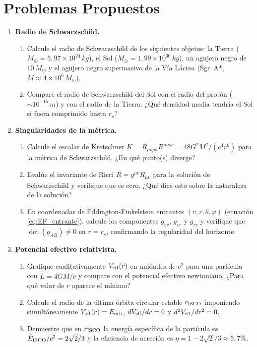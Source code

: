 \section{Problemas Propuestos}
\label{sec:problemas_cap7}

\begin{enumerate}[leftmargin=2em, label=\textbf{P\thechapter.\arabic*.}]

  \item \textbf{Radio de Schwarzschild.}
  \begin{enumerate}[label=(\alph*)]
    \item Calcule el radio de Schwarzschild de los siguientes objetos: la Tierra ($M_\oplus = 5{,}97\times10^{24}\,\si{kg}$), el Sol ($M_\odot = 1{,}99\times10^{30}\,\si{kg}$), un agujero negro de $10\,M_\odot$ y el agujero negro supermasivo de la Vía Láctea (Sgr~A*, $M \approx 4\times10^6\,M_\odot$).
    \item Compare el radio de Schwarzschild del Sol con el radio del protón ($\sim 10^{-15}\,\si{m}$) y con el radio de la Tierra. ¿Qué densidad media tendría el Sol si fuera comprimido hasta $r_s$?
  \end{enumerate}

  \item \textbf{Singularidades de la métrica.}
  \begin{enumerate}[label=(\alph*)]
    \item Calcule el escalar de Kretschner $K = R_{\mu\nu\rho\sigma}R^{\mu\nu\rho\sigma} = 48G^2M^2/(c^4 r^6)$ para la métrica de Schwarzschild. ¿En qué punto(s) diverge?
    \item Evalúe el invariante de Ricci $R = g^{\mu\nu}R_{\mu\nu}$ para la solución de Schwarzschild y verifique que es cero. ¿Qué dice esto sobre la naturaleza de la solución?
    \item En coordenadas de Eddington-Finkelstein entrantes $(v, r, \theta, \varphi)$ (ecuación \ref{eq:EF_entrante}), calcule los componentes $g_{vv}$, $g_{vr}$ y $g_{rr}$ y verifique que $\det(g_{AB}) \neq 0$ en $r = r_s$, confirmando la regularidad del horizonte.
  \end{enumerate}

  \item \textbf{Potencial efectivo relativista.}
  \begin{enumerate}[label=(\alph*)]
    \item Grafique cualitativamente $V_{\rm eff}(r)$ en unidades de $c^2$ para una partícula con $\tilde{L} = 4GM/c$ y compare con el potencial efectivo newtoniano. ¿Para qué valor de $r$ aparece el mínimo?
    \item Calcule el radio de la última órbita circular estable $r_{\rm ISCO}$ imponiendo simultáneamente $V_{\rm eff}(r) = E_{\rm orb}$, $dV_{\rm eff}/dr = 0$ y $d^2V_{\rm eff}/dr^2 = 0$.
    \item Demuestre que en $r_{\rm ISCO}$ la energía específica de la partícula es $\tilde{E}_{\rm ISCO}/c^2 = 2\sqrt{2}/3$ y la eficiencia de acreción es $\eta = 1 - 2\sqrt{2}/3 \approx 5{,}7\%$.
  \end{enumerate}


\end{enumerate}
